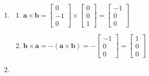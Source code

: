 \documentclass[11pt]{article}
\begin{document}
\begin{enumerate}[a]
	\item %
	\begin{enumerate}
		\item %
$\textbf{a} \times \textbf{b}=
\begin{bmatrix}
0 \\
-1 \\
0
\end{bmatrix}\times
\begin{bmatrix}
0 \\
0 \\
1
\end{bmatrix}=
\begin{bmatrix}
-1 \\
0 \\
0
\end{bmatrix}$
		\item %
$\textbf{b} \times \textbf{a}=-(\textbf{a} \times \textbf{b})=
-\begin{bmatrix}
-1 \\
0 \\
0
\end{bmatrix}=
\begin{bmatrix}
1 \\
0 \\
0
\end{bmatrix}$
	\end{enumerate}
	\item %
\end{enumerate}
\end{document}
